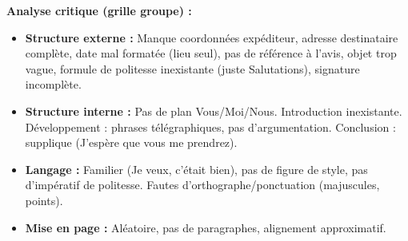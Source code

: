 \documentclass[11pt]{article}
\begin{document}
\begin{exoresolu}
\par
\textbf{Analyse critique (grille groupe) :}
\begin{itemize}
    \item \textbf{Structure externe :} Manque coordonnées expéditeur, adresse destinataire complète, date mal formatée (lieu seul), pas de référence à l'avis, objet trop vague, formule de politesse inexistante (juste \og{}Salutations\fg{}), signature incomplète.
    \item \textbf{Structure interne :} Pas de plan Vous/Moi/Nous. Introduction inexistante. Développement : phrases télégraphiques, pas d'argumentation. Conclusion : supplique (\og{}J'espère que vous me prendrez\fg{}).
    \item \textbf{Langage :} Familier (\og{}Je veux\fg{}, \og{}c'était bien\fg{}), pas de figure de style, pas d'impératif de politesse. Fautes d'orthographe/ponctuation (majuscules, points).
    \item \textbf{Mise en page :} Aléatoire, pas de paragraphes, alignement approximatif.
\end{itemize}


\end{exoresolu}
\end{document}

